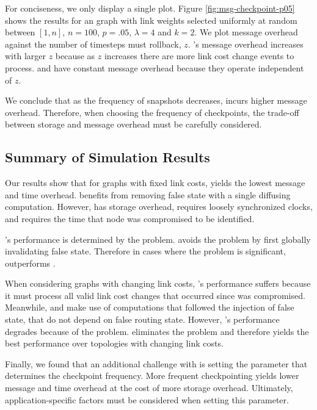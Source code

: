 For conciseness, we only display a single plot.  Figure \ref{fig:msg-checkpoint-p05} shows the results for an \er graph with link weights selected
uniformly at random between $[1,n]$,
$n=100$, $p=.05$, $\lambda=4$ and $k=2$. We plot message overhead against the number of timesteps \cpr must rollback, $z$. \cprs's message overhead increases with larger $z$ 
because as $z$ increases there are more link cost change events to process. \second and \purge have constant message overhead because they operate independent of $z$.

We conclude that as the frequency of \cpr snapshots decreases, \cpr incurs higher message overhead.  Therefore, when choosing the frequency of checkpoints,
the trade-off between storage and message overhead must be carefully considered. 








\subsection{Summary of Simulation Results}
\label{subsec:discuss}

Our results show that for graphs with fixed link costs, \cpr yields the lowest message and time overhead. \cpr benefits from removing false state with a single
diffusing computation. However, \cpr has storage overhead, requires loosely synchronized clocks, and requires the time that node \bad was compromised to be identified.

\seconds's performance is determined by the \infinity problem. \purge avoids the \infinity problem by first globally invalidating false state.  Therefore in cases where the \infinity problem is 
significant, \purge outperforms \seconds.

When considering graphs with changing link costs, \cprs's performance suffers because it must process all valid link cost changes that occurred since \bad was compromised.
Meanwhile, \second and \purge make use of computations that followed the injection of false state, that do not depend on false routing state. However, \seconds's performance degrades 
because of the \infinity problem.  \purge eliminates the \infinity problem and therefore yields the best performance over topologies with changing link costs.

Finally, we found that an additional challenge with \cpr is setting the parameter that determines the checkpoint frequency.
More frequent checkpointing yields lower message and time overhead at the cost of more storage overhead. Ultimately, application-specific factors must be considered
when setting this parameter. 

